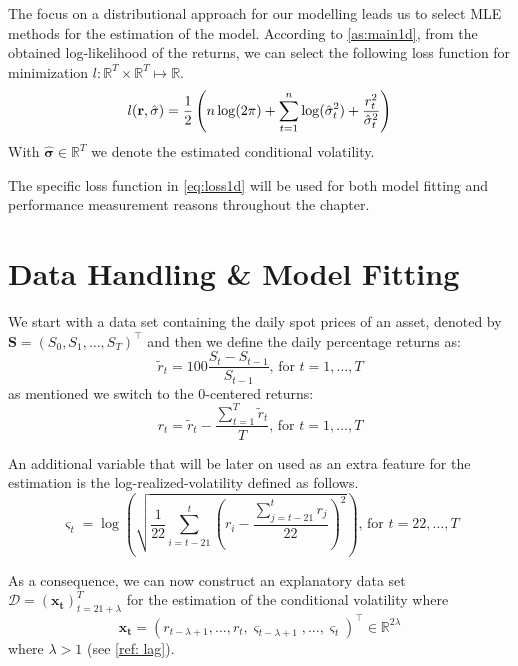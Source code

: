 \documentclass[a4paper, oneside]{discothesis}
\begin{document}
The focus on a distributional approach for our modelling leads us to select MLE methods for the estimation of the model. According to \ref{as:main1d}, from the obtained log-likelihood of the returns, we can select the following loss function for minimization $l:\mathbb{R}^T\times\mathbb{R}^T\mapsto\mathbb{R}$.
\begin{equation}\label{eq:loss1d}
    l(\mathbf{r}, \hat{\mathbf{\sigma}}) = \\\frac{1}{2}\left(n\log(2\pi)+\sum_{t=1}^n \log(\hat{\sigma}_t^2)+\frac{r_t^2}{\hat{\sigma}_t^2}\right)
\end{equation}
With $\hat{\mathbf{\sigma}}\in \mathbb{R}^T$ we denote the estimated conditional volatility.

\begin{remark}
The specific loss function in \ref{eq:loss1d} will be used for both model fitting and performance measurement reasons throughout the chapter. 
\end{remark}
\section{Data Handling \& Model Fitting}
We start with a data set containing the daily spot prices of an asset, denoted by $\mathbf{S} = (S_0, S_1, \dots, S_T)^\intercal$ and then we define the daily percentage returns as:
\begin{equation}
    \tilde{r}_{t} = 100\frac{S_{t}-S_{t-1}}{S_{t-1}} \text{,  for } t = 1, \dots, T 
\end{equation}
as mentioned we switch to the 0-centered returns:
\begin{equation}
    r_t = \tilde{r}_t - \frac{\sum_{t = 1}^{T}\tilde{r}_t}{T} \text{,  for } t = 1, \dots, T 
\end{equation}

An additional variable that will be later on used as an extra feature for the estimation is the log-realized-volatility defined as follows. 
\begin{equation}\label{eq:rv}
    \varsigma_t = \log\left(\sqrt{\frac{1}{22}\sum_{i = t-21}^t \left(r_i - \frac{\sum_{j=t-21}^t r_j}{22}\right)^2}\right)\text{,  for } t = 22, \dots, T 
\end{equation}

As a consequence, we can now construct an explanatory data set $\mathcal{D} = (\mathbf{x_t})_{t=21+\lambda}^T$ for the estimation of the conditional volatility where 
\begin{equation}
    \mathbf{x_t} = (r_{t-\lambda+1}, \dots, r_{t}, \varsigma_{t-\lambda+1},\dots, \varsigma_{t})^\intercal\in\mathbb{R}^{2\lambda}
\end{equation}
where $\lambda>1$ (see \ref{ref: lag}).
\end{document}

